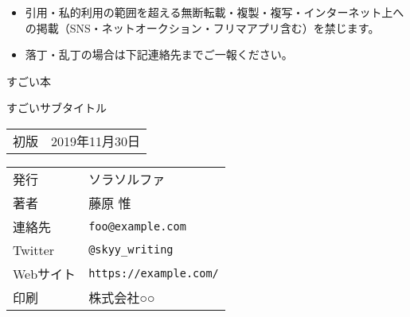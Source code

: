 \backmatter
\thispagestyle{empty}

\begin{itemize}
\item 引用・私的利用の範囲を超える無断転載・複製・複写・インターネット上への掲載（SNS・ネットオークション・フリマアプリ含む）を禁じます。
\item 落丁・乱丁の場合は下記連絡先までご一報ください。
\end{itemize}


\begin{center}
\textsf{すごい本}

すごいサブタイトル

\begin{tabular}{ll}
初版 & 2019年11月30日 \\
\end{tabular}

\begin{tabular}{ll} \toprule
    発行      & ソラソルファ \\
    著者      & 藤原 惟 \\
    連絡先    & \verb|foo@example.com| \\
        Twitter & \verb|@skyy_writing| \\
        Webサイト & \verb|https://example.com/| \\
        印刷      & 株式会社○○  \\ \bottomrule
\end{tabular}
\end{center}
